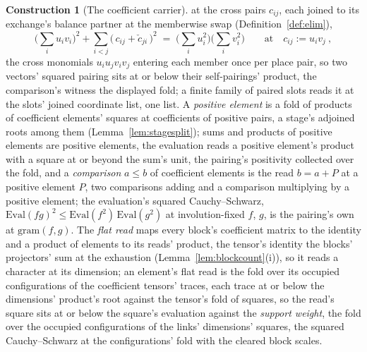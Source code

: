 \documentclass[11pt]{article}
\theoremstyle{definition}
\newtheorem{construction}{Construction}
\begin{document}
\begin{construction}[The coefficient carrier]
at the cross pairs $c_{ij}$, each joined to its exchange's
balance partner at the memberwise swap
(Definition~\ref{def:elim}),
\[
\Big(\sum_i u_iv_i\Big)^{2}
+\sum_{i<j}\big(\,c_{ij}+\check c_{ji}\,\big)^{2}
\;=\;\Big(\sum_i u_i^2\Big)\Big(\sum_i v_i^2\Big)
\qquad\text{at}\quad c_{ij}:=u_iv_j\ ,
\]
the cross monomials $u_iu_jv_iv_j$ entering each member once per
place pair, so two vectors' squared pairing sits at or below their
self-pairings' product, the comparison's witness the displayed
fold; a finite family of paired slots reads it at the slots'
joined coordinate list, one list. A \emph{positive element} is a
fold of products of coefficient elements' squares at coefficients
of positive pairs, a stage's adjoined roots among them
(Lemma~\ref{lem:stagesplit}); sums and products of positive
elements are positive elements, the evaluation reads a positive
element's product with a square at or beyond the sum's unit, the
pairing's positivity collected over the fold, and a
\emph{comparison} $a\le b$ of coefficient elements is the read
$b=a+P$ at a positive element $P$, two comparisons adding and a
comparison multiplying by a positive element; the evaluation's
squared Cauchy--Schwarz, $\mathrm{Eval}(fg)^{2}\le
\mathrm{Eval}(f^{2})\,\mathrm{Eval}(g^{2})$ at involution-fixed
$f$, $g$, is the pairing's own at $\mathrm{gram}(f,g)$. The
\emph{flat read} maps every block's coefficient matrix to the
identity and a product of elements to its reads' product, the
tensor's identity the blocks' projectors' sum at the exhaustion
(Lemma~\ref{lem:blockcount}(i)), so it reads a character at its
dimension; an element's flat read is the fold over its occupied
configurations of the coefficient tensors' traces, each trace at
or below the dimensions' product's root against the tensor's fold
of squares, so the read's square sits at or below the square's
evaluation against the \emph{support weight}, the fold over the
occupied configurations of the links' dimensions' squares, the
squared Cauchy--Schwarz at the configurations' fold with the
cleared block scales.
\end{construction}
\end{document}
